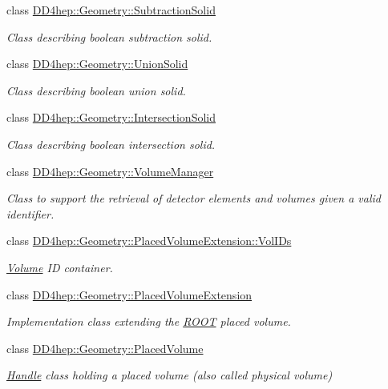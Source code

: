 \begin{DoxyCompactItemize}
class \hyperlink{class_d_d4hep_1_1_geometry_1_1_subtraction_solid}{D\+D4hep\+::\+Geometry\+::\+Subtraction\+Solid}
\begin{DoxyCompactList}\small\item\em Class describing boolean subtraction solid. \end{DoxyCompactList}\item 
class \hyperlink{class_d_d4hep_1_1_geometry_1_1_union_solid}{D\+D4hep\+::\+Geometry\+::\+Union\+Solid}
\begin{DoxyCompactList}\small\item\em Class describing boolean union solid. \end{DoxyCompactList}\item 
class \hyperlink{class_d_d4hep_1_1_geometry_1_1_intersection_solid}{D\+D4hep\+::\+Geometry\+::\+Intersection\+Solid}
\begin{DoxyCompactList}\small\item\em Class describing boolean intersection solid. \end{DoxyCompactList}\item 
class \hyperlink{class_d_d4hep_1_1_geometry_1_1_volume_manager}{D\+D4hep\+::\+Geometry\+::\+Volume\+Manager}
\begin{DoxyCompactList}\small\item\em Class to support the retrieval of detector elements and volumes given a valid identifier. \end{DoxyCompactList}\item 
class \hyperlink{class_d_d4hep_1_1_geometry_1_1_placed_volume_extension_1_1_vol_i_ds}{D\+D4hep\+::\+Geometry\+::\+Placed\+Volume\+Extension\+::\+Vol\+I\+Ds}
\begin{DoxyCompactList}\small\item\em \hyperlink{class_d_d4hep_1_1_geometry_1_1_volume}{Volume} ID container. \end{DoxyCompactList}\item 
class \hyperlink{class_d_d4hep_1_1_geometry_1_1_placed_volume_extension}{D\+D4hep\+::\+Geometry\+::\+Placed\+Volume\+Extension}
\begin{DoxyCompactList}\small\item\em Implementation class extending the \hyperlink{namespace_r_o_o_t}{R\+O\+OT} placed volume. \end{DoxyCompactList}\item 
class \hyperlink{class_d_d4hep_1_1_geometry_1_1_placed_volume}{D\+D4hep\+::\+Geometry\+::\+Placed\+Volume}
\begin{DoxyCompactList}\small\item\em \hyperlink{class_d_d4hep_1_1_handle}{Handle} class holding a placed volume (also called physical volume) \end{DoxyCompactList}\item 

\end{DoxyCompactItemize}
